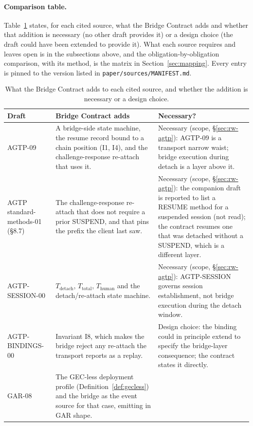 \paragraph{Comparison table.}
Table~\ref{tab:comparison} states, for each cited source, what the Bridge
Contract adds and whether that addition is necessary (no other draft
provides it) or a design choice (the draft could have been extended to
provide it). What each source requires and leaves open is in the
subsections above, and the obligation-by-obligation comparison, with its
method, is the matrix in Section~\ref{sec:mapping}. Every entry is pinned to
the version listed in \texttt{paper/sources/MANIFEST.md}.

\begin{table}[htbp]
\centering
\caption{What the Bridge Contract adds to each cited source, and whether
the addition is necessary or a design choice.}
\label{tab:comparison}
\footnotesize
\begin{tabularx}{\columnwidth}{l X X}
\toprule
\textbf{Draft} & \textbf{Bridge Contract adds} & \textbf{Necessary?} \\
\midrule
AGTP-09 &
A bridge-side state machine, the resume record bound to a chain
position (I1, I4), and the challenge-response re-attach that uses it. &
Necessary (scope, §\ref{sec:rw-agtp}): AGTP-09 is a transport narrow waist; bridge execution during detach is a layer above it. \\
AGTP standard-methods-01 (\S 8.7) &
The challenge-response re-attach that does not require a prior SUSPEND,
and that pins the prefix the client last saw. &
Necessary (scope, §\ref{sec:rw-agtp}): the companion draft is reported to list a RESUME method for a suspended session (not read); the contract resumes one that was detached without a SUSPEND, which is a different layer. \\
AGTP-SESSION-00 &
$T_{\text{detach}}$, $T_{\text{total}}$, $T_{\text{human}}$ and the
detach/re-attach state machine. &
Necessary (scope, §\ref{sec:rw-agtp}): AGTP-SESSION governs session establishment, not bridge execution during the detach window. \\
AGTP-BINDINGS-00 &
Invariant I8, which makes the bridge reject any re-attach the transport
reports as a replay. &
Design choice: the binding could in principle extend to specify the
bridge-layer consequence; the contract states it directly. \\
GAR-08 &
The GEC-less deployment profile (Definition~\ref{def:gecless}) and the
bridge as the event source for that case, emitting in GAR shape. &

\end{tabularx}
\end{table}
